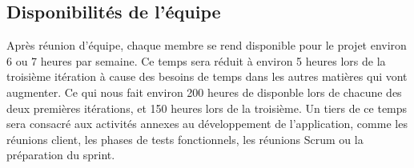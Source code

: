 \documentclass[hidelinks, 10pt,a4paper]{article}
\begin{document}
\subsection{Disponibilités de l'équipe}
Après réunion d'équipe, chaque membre se rend disponible pour le projet environ
6 ou 7 heures par semaine. Ce temps sera réduit à environ 5 heures lors de la troisième
itération à cause des besoins de temps dans les autres matières qui vont augmenter.
Ce qui nous fait environ 200 heures de disponble lors de chacune des deux premières itérations,
et 150 heures lors de la troisième.
Un tiers de ce temps sera consacré aux activités annexes au développement de l'application,
comme les réunions client, les phases de tests fonctionnels, les réunions Scrum ou la préparation
du sprint.
\end{document}
